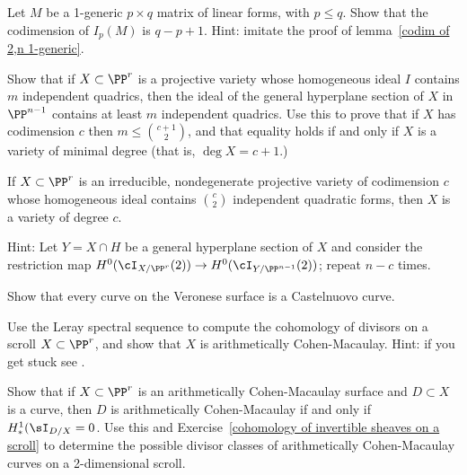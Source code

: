 \begin{exercise}
Let $M$ be a 1-generic $p\times q$ matrix of linear forms, with $p\leq q$. Show that the codimension of
$I_p(M)$ is $q-p+1$. Hint: imitate the proof of lemma~\ref{codim of 2,n 1-generic}.
\end{exercise}

\begin{exercise}
Show that if $X\subset \PP^r$ is a projective variety whose homogeneous ideal $I$ contains $m$ independent quadrics, then the ideal of the general hyperplane section of $X$ in $\PP^{n-1}$
contains at least $m$ independent quadrics. Use this to prove that if $X$ has codimension $c$ then $m\leq {c+1\choose 2}$, and that equality holds if and only if
$X$ is a variety of minimal degree (that is, $\deg X = c+1$.)
\end{exercise}

\begin{exercise}\label{many quadrics}
 If $X \subset \PP^r$ is an irreducible, nondegenerate projective variety of codimension $c$ whose homogeneous ideal
 contains ${c\choose 2}$ independent quadratic forms, then $X$ is a variety of degree $c$.
 
Hint: Let $Y = X \cap H$ be a general hyperplane section of $X$ and consider the restriction map $H^0(\cI_{X/\PP^r}(2)) \to H^0(\cI_{Y/\PP^{n-1}}(2))$; repeat $n-c$ times.
\end{exercise}

\begin{exercise}\label{Castelnuovo Veronese}
Show that every curve on the Veronese surface is a Castelnuovo curve.
\end{exercise}

\begin{exercise}\label{cohomology of invertible sheaves on a scroll}
Use the Leray spectral sequence to compute the cohomology of divisors on a scroll $X\subset \PP^r$,
and show that $X$ is arithmetically Cohen-Macaulay.
Hint: if you get stuck see \cite[Section V.1]{Hartshorne1977}.
\end{exercise}

\begin{exercise}
 Show that if $X\subset\PP^r$ is an arithmetically Cohen-Macaulay surface
and $D\subset X$ is a curve, then $D$ is arithmetically Cohen-Macaulay if and only if
$H^1_*(\sI_{D/X} = 0$. Use this and Exercise~\ref{cohomology of invertible sheaves on a scroll} to determine the
possible divisor classes of arithmetically Cohen-Macaulay curves on a 2-dimensional scroll.
\end{exercise}

